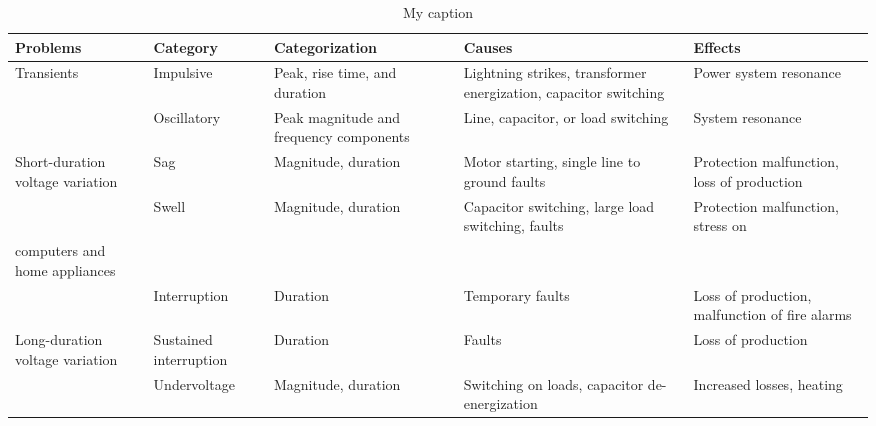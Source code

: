 \begin{adjustbox}{center}
\begin{table}[]
\centering
\caption{My caption}
\label{my-label}
\begin{tabular}{lllll}
\hline
\textbf{Problems}                & \textbf{Category}      & \textbf{Categorization}                       & \textbf{Causes}                                                                  & \textbf{Effects}                                  \\ \hline
Transients                       & Impulsive              & Peak, rise time, and duration                 & Lightning strikes, transformer energization, capacitor switching                 & Power system resonance                            \\
                                 & Oscillatory            & Peak magnitude and frequency components       & Line, capacitor, or load switching                                               & System resonance                                  \\
Short-duration voltage variation & Sag                    & Magnitude, duration                           & Motor starting, single line to ground faults                                     & Protection malfunction, loss of production        \\
                                 & Swell                  & Magnitude, duration                           & Capacitor switching, large load switching, faults                                & Protection malfunction, stress on                 \\
computers and home appliances    &                        &                                               &                                                                                  &                                                   \\
                                 & Interruption           & Duration                                      & Temporary faults                                                                 & Loss of production, malfunction of fire alarms    \\
Long-duration voltage variation  & Sustained interruption & Duration                                      & Faults                                                                           & Loss of production                                \\
                                 & Undervoltage           & Magnitude, duration                           & Switching on loads, capacitor de-energization                                    & Increased losses, heating                         \\

\end{tabular}
\end{table}
\end{adjustbox}
